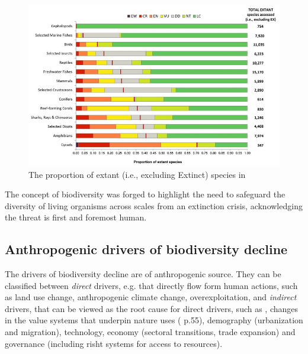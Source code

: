 \begin{figure}[h]
    \centering
    \includegraphics[width=0.8\linewidth]{figures/intro/IUCN_redlist}
    \caption{The proportion of extant (i.e., excluding Extinct) species in \citet{IUCN_redlist_2024}}
    \label{fig:intro_iucn}
\end{figure}

The concept of biodiversity was forged to highlight the need to safeguard the diversity of living organisms across scales from an extinction crisis, acknowledging the threat is first and foremost human. 

\subsection*{Anthropogenic drivers of biodiversity decline}

The drivers of biodiversity decline are of anthropogenic source. They can be classified between \textit{direct} drivers, e.g. that directly flow form human actions, such as land use change, anthropogenic climate change, overexploitation, and \textit{indirect} drivers, that can be viewed as the root cause for direct drivers, such as  , changes in the value systems that underpin nature uses (\cite{ipbes_2022_6417333} p.55), demography (urbanization and migration), technology, economy (sectoral transitions, trade expansion) and governance (including risht systems for access to resources).

